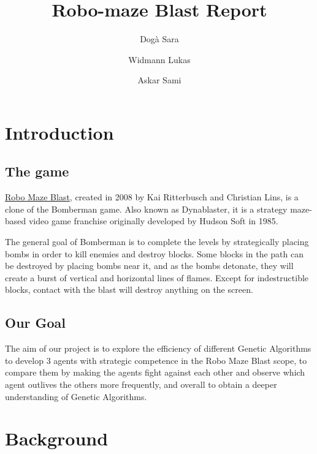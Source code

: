 \documentclass[sigconf]{acmart} %
\title{Robo-maze Blast Report}
\author{Dogà Sara}
\author{Widmann Lukas}
\author{Askar Sami}
\begin{document}
\maketitle



\section{Introduction}

\subsection{The game}
\href{https://codeberg.org/chrlns/robo-maze-blast.git}{Robo Maze Blast}, created in 2008 by Kai Ritterbusch and Christian Lins, is a clone of the Bomberman game. Also known as Dynablaster, it is a strategy maze-based video game franchise originally developed by Hudson Soft in 1985.

The general goal of Bomberman is to complete the levels by strategically placing bombs in order to kill enemies and destroy blocks. Some blocks in the path can be destroyed by placing bombs near it, and as the bombs detonate, they will create a burst of vertical and horizontal lines of flames. Except for indestructible blocks, contact with the blast will destroy anything on the screen.

\subsection{Our Goal}
The aim of our project is to explore the efficiency of different Genetic Algorithms to develop 3 agents with strategic competence in the Robo Maze Blast scope, to compare them by making the agents fight against each other and observe which agent outlives the others more frequently, and overall to obtain a deeper understanding of Genetic Algorithms.

\section{Background}
\end{document}
